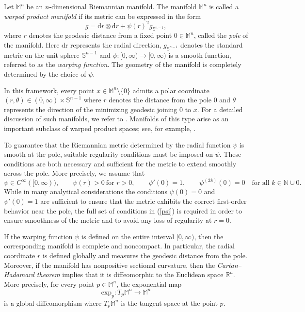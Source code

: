 \documentclass[a4paper,11pt,reqno]{amsart}
\renewcommand\eqref[1]{(\ref{#1})}
\theoremstyle{plain}
\numberwithin{equation}{section} \allowdisplaybreaks
\newcommand{\m}{\mathbb{M}^n}
\newcommand{\sn}{\mathbb{S}^{n-1}}
\newcommand{\rn}{\mathbb{R}^n}
\begin{document}
Let $\m$ be an $n$-dimensional Riemannian manifold. The manifold 
$\m$ is called a \emph{warped product manifold} if its metric can be expressed in the form
\begin{equation}\label{metric}
g = \mathrm{d}r \otimes \mathrm{d}r + \psi(r)^2 g_{\mathbb{S}^{n-1}},
\end{equation}
where $r$ denotes the geodesic distance from a fixed point 
$0\in \m$, called the \emph{pole} of the manifold. Here 
$\mathrm{dr}$ represents the radial direction, $g_{\sn}$ denotes the standard metric on the unit sphere $\sn$ and $\psi: [0,\infty) \to [0,\infty)$ is a smooth function, referred to as the \emph{warping function}. The geometry of the manifold is completely determined by the choice of $\psi$.

In this framework, every point $x \in \m\setminus\{0\}$ admits a polar coordinate $(r,\theta)\in (0,\infty)\times \sn$ where $r$ denotes the distance from the pole $0$ and $\theta$ represents the direction of the minimizing geodesic joining $0$ to $x$. For a detailed discussion of such manifolds, we refer to \cite[Section 3.10]{grig}. Manifolds of this type arise as an important subclass of warped product spaces; see, for example, \cite[Section 1.8]{AMR}.

\medskip 

To guarantee that the Riemannian metric determined by the radial function $\psi$ is smooth at the pole, suitable regularity conditions must be imposed on $\psi$. These conditions are both necessary and sufficient for the metric to extend smoothly across the pole. More precisely, we assume that
\begin{equation}\label{psi}
\psi \in C^\infty([0,\infty)), \qquad
\psi(r) > 0 \ \text{for } r>0, \qquad
\psi'(0)=1, \qquad
\psi^{(2k)}(0)=0 \quad \text{for all } k \in \mathbb{N}\cup{0}.
\end{equation}
While in many analytical considerations the conditions $\psi(0)=0$ and $\psi'(0)=1$ are sufficient to ensure that the metric exhibits the correct first-order behavior near the pole, the full set of conditions in \eqref{psi} is required in order to ensure smoothness of the metric and to avoid any loss of regularity at $r=0$.

If the warping function $\psi$ is defined on the entire interval $[0,\infty)$, then the corresponding manifold is complete and noncompact. In particular, the radial coordinate $r$ is defined globally and measures the geodesic distance from the pole. Moreover, if the manifold has nonpositive sectional curvature, then the \emph{Cartan–Hadamard theorem} implies that it is diffeomorphic to the Euclidean space $\rn$. More precisely, for every point $p\in \m$, the exponential map $$\mathrm{exp}_p: T_p\m\to \m$$
is a global diffeomorphism where $T_p\m$ is the tangent space at the point $p$.
\end{document}
